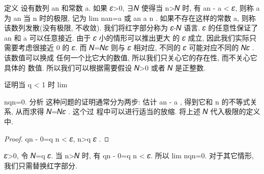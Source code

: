 \begin{frame}
	定义 设有数列 an 和常数 a. 如果
\forall 𝜀>0, ∃𝑁 使得当 n>𝑁 时, 有 an - a < 𝜀,
	则称 a 为 an 当 n \ra \infty 时的极限, 记为 lim
n\ra\infty an=a 或 an \ra a n \ra \infty .
	如果不存在这样的常数 a, 则称该数列发散(没有极限, 不收敛).
	我们将红字部分称为 𝜀-𝑁 语言.
	𝜀 的任意性保证了 an 和 a 可以任意接近. 由于 𝜀 小的情形可以推出更大
的 𝜀 成立, 因此我们实际只需要考虑很接近 0 的 𝜀.
	而 𝑁=𝑁𝜀 则与 𝜀 相对应, 不同的 𝜀 可能对应不同的 𝑁𝜀 . 该数值可以换成
任何一个比它大的数值, 所以我们只关心它的存在性, 而不关心它具体的
数值. 所以我们可以根据需要假设 𝑁>0 或者 𝑁 是正整数.
\end{frame}


\begin{frame}
	\begin{example}
证明当 q < 1 时 lim
\end{example}
n\ra\infty qn=0.
	分析 这种问题的证明通常分为两步:
	估计 an - a , 得到它和 n 的不等式关系, 从而求得 𝑁=𝑁𝜀 . 这个过
程中可以进行适当的放缩.
	将上述 𝑁 代入极限的定义中.
	\begin{proof}
qn - 0=q n < 𝜀, n>\log q 𝜀 .
\end{proof}
	\forall 𝜀>0, 令 𝑁=\log q 𝜀. 当 n>𝑁 时, 有 qn - 0=q n < 𝜀. 所以
lim
n\ra\infty qn=0.
	对于其它情形, 我们只需替换红字部分.
\end{frame}






